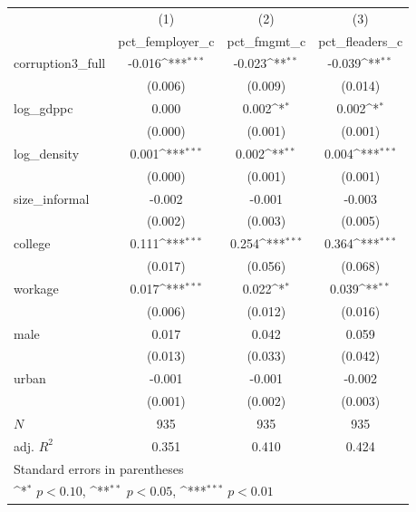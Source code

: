 {
\def\sym#1{\ifmmode^{#1}\else\(^{#1}\)\fi}
\begin{tabular}{l*{3}{c}}
\hline\hline
            &\multicolumn{1}{c}{(1)}&\multicolumn{1}{c}{(2)}&\multicolumn{1}{c}{(3)}\\
            &\multicolumn{1}{c}{pct\_femployer\_c}&\multicolumn{1}{c}{pct\_fmgmt\_c}&\multicolumn{1}{c}{pct\_fleaders\_c}\\
\hline
corruption3\_full&      -0.016\sym{***}&      -0.023\sym{**} &      -0.039\sym{**} \\
            &     (0.006)         &     (0.009)         &     (0.014)         \\
[1em]
log\_gdppc   &       0.000         &       0.002\sym{*}  &       0.002\sym{*}  \\
            &     (0.000)         &     (0.001)         &     (0.001)         \\
[1em]
log\_density &       0.001\sym{***}&       0.002\sym{**} &       0.004\sym{***}\\
            &     (0.000)         &     (0.001)         &     (0.001)         \\
[1em]
size\_informal&      -0.002         &      -0.001         &      -0.003         \\
            &     (0.002)         &     (0.003)         &     (0.005)         \\
[1em]
college     &       0.111\sym{***}&       0.254\sym{***}&       0.364\sym{***}\\
            &     (0.017)         &     (0.056)         &     (0.068)         \\
[1em]
workage     &       0.017\sym{***}&       0.022\sym{*}  &       0.039\sym{**} \\
            &     (0.006)         &     (0.012)         &     (0.016)         \\
[1em]
male        &       0.017         &       0.042         &       0.059         \\
            &     (0.013)         &     (0.033)         &     (0.042)         \\
[1em]
urban       &      -0.001         &      -0.001         &      -0.002         \\
            &     (0.001)         &     (0.002)         &     (0.003)         \\
\hline
\(N\)       &         935         &         935         &         935         \\
adj. \(R^{2}\)&       0.351         &       0.410         &       0.424         \\
\hline\hline
\multicolumn{4}{l}{\footnotesize Standard errors in parentheses}\\
\multicolumn{4}{l}{\footnotesize \sym{*} \(p<0.10\), \sym{**} \(p<0.05\), \sym{***} \(p<0.01\)}\\
\end{tabular}
}
